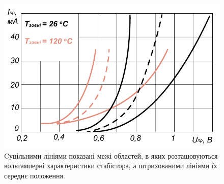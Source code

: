 \documentclass[a4paper,14pt]{extreport}
\begin{document}
\vspace{0.5 cm}\par
{}\par
\vspace{0.2 cm}\par
{}\par
\vspace{0.2 cm}\par
{}\par
\vspace{1.5 cm}\par

\begin{figure}[h!]\label{im7}
  \begin{center}
    \includegraphics[width=0.9\linewidth]{1.3.29.pdf}
    \caption{Cуцільними лініями показані межі областей, в яких розташовуються вольтамперні характеристики стабістора, а штрихованими лініями їх середнє положення.}
  \end{center}
\end{figure}
\clearpage
\end{document}
